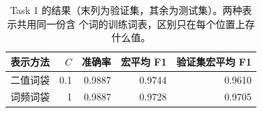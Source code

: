 \begin{table}[t]
\centering
\footnotesize
\caption{Task 1 的结果（末列为验证集，其余为测试集）。两种表示共用同一份含 \resultVocabSize{} 个词的训练词表，区别只在每个位置上存什么值。}
\label{tab:task1}
\begin{tabular}{lrrrr}
\toprule
表示方法 & $C$ & 准确率 & 宏平均 F1 & 验证集宏平均 F1 \\
\midrule
二值词袋 & 0.1 & 0.9887 & 0.9744 & 0.9610 \\
词频词袋 & 1 & 0.9887 & 0.9728 & 0.9705 \\
\bottomrule
\end{tabular}
\end{table}
